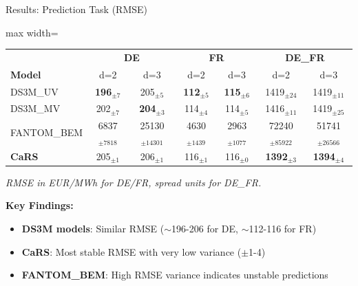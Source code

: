 \documentclass[aspectratio=169]{beamer}
\begin{document}
\begin{frame}{Results: Prediction Task (RMSE)}
\begin{table}
\centering
\small
\begin{adjustbox}{max width=\textwidth}
\begin{tabular}{l|cc|cc|cc}
\toprule
& \multicolumn{2}{c|}{\textbf{DE}} & \multicolumn{2}{c|}{\textbf{FR}} & \multicolumn{2}{c}{\textbf{DE\_FR}} \\
\textbf{Model} & d=2 & d=3 & d=2 & d=3 & d=2 & d=3 \\
\midrule
DS3M\_UV & \textbf{196}$_{\pm7}$ & 205$_{\pm5}$ & \textbf{112}$_{\pm5}$ & \textbf{115}$_{\pm6}$ & 1419$_{\pm24}$ & 1419$_{\pm11}$ \\
DS3M\_MV & 202$_{\pm7}$ & \textbf{204}$_{\pm3}$ & 114$_{\pm4}$ & 114$_{\pm5}$ & 1416$_{\pm11}$ & 1419$_{\pm25}$ \\
FANTOM\_BEM & 6837$_{\pm7818}$ & 25130$_{\pm14301}$ & 4630$_{\pm1439}$ & 2963$_{\pm1077}$ & 72240$_{\pm85922}$ & 51741$_{\pm26566}$ \\
\midrule
\textbf{CaRS} & 205$_{\pm1}$ & 206$_{\pm1}$ & 116$_{\pm1}$ & 116$_{\pm0}$ & \textbf{1392}$_{\pm3}$ & \textbf{1394}$_{\pm4}$ \\
\bottomrule
\end{tabular}
\end{adjustbox}
\end{table}

\vspace{0.2cm}
{\scriptsize \textit{RMSE in EUR/MWh for DE/FR, spread units for DE\_FR.}} %

\vspace{0.2cm}
\textbf{Key Findings:}
\begin{itemize}
    \item \textbf{DS3M models}: Similar RMSE ($\sim$196-206 for DE, $\sim$112-116 for FR)
    \item \textbf{CaRS}: Most stable RMSE with very low variance ($\pm$1-4)
    \item \textbf{FANTOM\_BEM}: High RMSE variance indicates unstable predictions
\end{itemize}
\end{frame}
\end{document}
